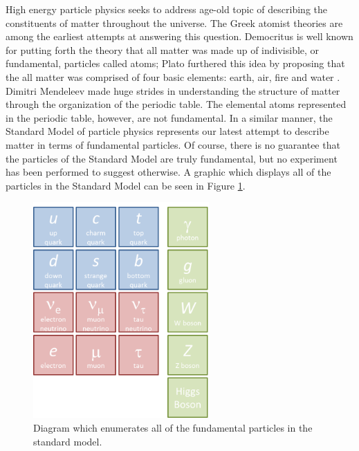 High energy particle physics seeks to address age-old topic of describing the
constituents of matter throughout the universe.  The Greek atomist theories are
among the earliest attempts at answering this question.
Democritus is well
known for putting forth the theory that all matter was made up of indivisible,
or fundamental, particles called atoms;  Plato furthered this idea by proposing
that the all matter was comprised of four basic elements: earth, air, fire and
water \cite{berryman2008atomism}.  Dimitri Mendeleev made huge strides in
understanding the structure of matter through the organization of the periodic
table.  The elemental atoms represented in the periodic table, however, are not
fundamental.  In a similar manner, the Standard Model of particle physics
represents our latest attempt to describe matter in terms of fundamental
particles.  Of course, there is no guarantee that the particles of the Standard
Model are truly fundamental, but no experiment has been performed to suggest
otherwise.  A graphic which displays all of the particles in the Standard Model
can be seen in Figure \ref{sm}.



\begin{figure}[h]
  \begin{center}
    \includegraphics[width=0.6\textwidth]{figures/figures/sm.png}
  \end{center}
  \caption{Diagram which enumerates all of the fundamental particles in the
  standard model.}
  \label{sm}
\end{figure}

